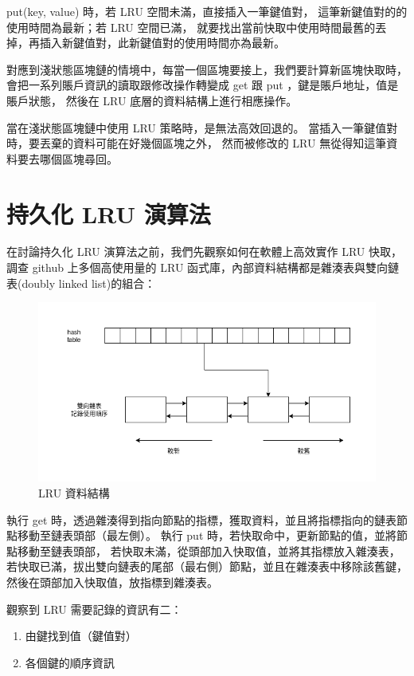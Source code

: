 put(key, value) 時，若 LRU 空間未滿，直接插入一筆鍵值對，
這筆新鍵值對的的使用時間為最新；若 LRU 空間已滿，
就要找出當前快取中使用時間最舊的丟掉，再插入新鍵值對，此新鍵值對的使用時間亦為最新。

對應到淺狀態區塊鏈的情境中，每當一個區塊要接上，我們要計算新區塊快取時，
會把一系列賬戶資訊的讀取跟修改操作轉變成 get 跟 put ，鍵是賬戶地址，值是賬戶狀態，
然後在 LRU 底層的資料結構上進行相應操作。

當在淺狀態區塊鏈中使用 LRU 策略時，是無法高效回退的。
當插入一筆鍵值對時，要丟棄的資料可能在好幾個區塊之外，
然而被修改的 LRU 無從得知這筆資料要去哪個區塊尋回。

\section{持久化 LRU 演算法}
在討論持久化 LRU 演算法之前，我們先觀察如何在軟體上高效實作 LRU 快取，
調查 github 上多個高使用量的 LRU 函式庫，內部資料結構都是雜湊表與雙向鏈表(doubly linked list)的組合：

\begin{figure}[h]
\includegraphics[width=\textwidth]{LRU}
\caption{LRU 資料結構}
\end{figure}


執行 get 時，透過雜湊得到指向節點的指標，獲取資料，並且將指標指向的鏈表節點移動至鏈表頭部（最左側）。
執行 put 時，若快取命中，更新節點的值，並將節點移動至鏈表頭部，
若快取未滿，從頭部加入快取值，並將其指標放入雜湊表，
若快取已滿，拔出雙向鏈表的尾部（最右側）節點，並且在雜湊表中移除該舊鍵，
然後在頭部加入快取值，放指標到雜湊表。

觀察到 LRU 需要記錄的資訊有二：

\begin{enumerate}
  \item 由鍵找到值（鍵值對）
  \item 各個鍵的順序資訊
\end{enumerate}

